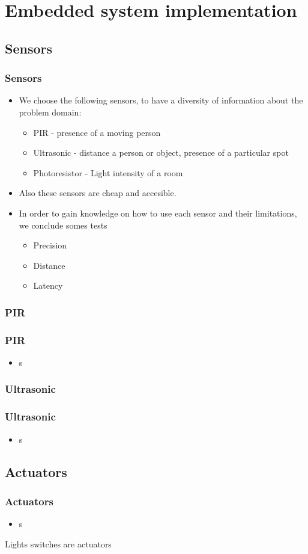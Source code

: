\section{Embedded system implementation}
\subsection{Sensors}
\begin{frame}
	\frametitle{Sensors}
	\begin{itemize}
		\item We choose the following sensors, to have a diversity of information about the problem domain:
		\begin{itemize}
		  \item PIR - presence of a moving person
		  \item Ultrasonic - distance a person or object, presence of a particular spot
		  \item Photoresistor - Light intensity of a room
		\end{itemize}
		\item Also these sensors are cheap and accesible.
		\item In order to gain knowledge on how to use each sensor and their limitations, we conclude somes tests
		\begin{itemize}
		  \item Precision
		  \item Distance
		  \item Latency
		\end{itemize}
	\end{itemize}
\end{frame}
\subsubsection{PIR}
\begin{frame}
	\frametitle{PIR}
	\begin{itemize}
    \item s
	\end{itemize}
\end{frame}
\subsubsection{Ultrasonic}
\begin{frame}
	\frametitle{Ultrasonic}
	\begin{itemize}
    \item s
	\end{itemize}
\end{frame}
\subsection{Actuators}
\begin{frame}
	\frametitle{Actuators}
  \begin{itemize}
    \item s
	\end{itemize}
	Lights switches are actuators
\end{frame}
